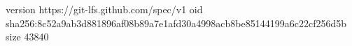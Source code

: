 version https://git-lfs.github.com/spec/v1
oid sha256:8c52a9ab3d881896af08b89a7e1afd30a4998acb8be85144199a6c22cf256d5b
size 43840

